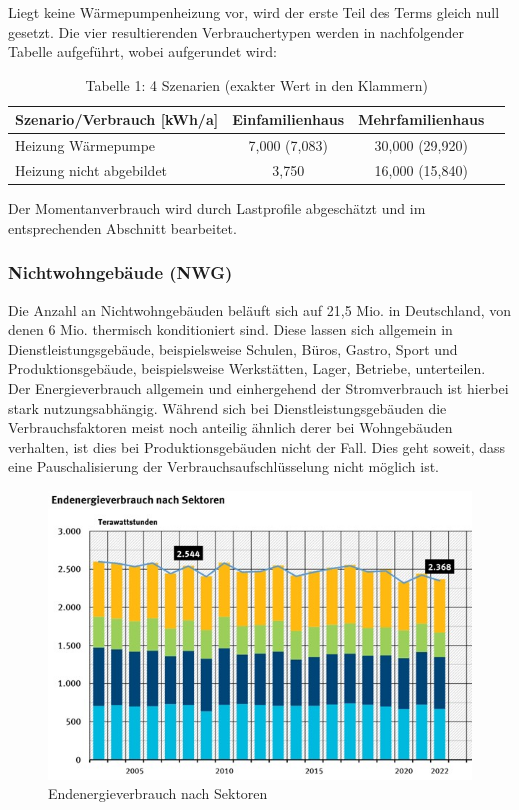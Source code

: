 Liegt keine Wärmepumpenheizung vor, wird der erste Teil des Terms gleich null gesetzt. 
Die vier resultierenden Verbrauchertypen werden in nachfolgender Tabelle aufgeführt, wobei aufgerundet wird:

\begin{table}[htbp]
    \centering
    \caption{Tabelle 1: 4 Szenarien (exakter Wert in den Klammern)}
    \label{tab:szenarien}
    \begin{tabular}{lccc}
        \toprule
        \textbf{Szenario/Verbrauch [kWh/a]} & \textbf{Einfamilienhaus} & \textbf{Mehrfamilienhaus} \\
        \midrule
        Heizung Wärmepumpe & 7,000 (7,083) & 30,000 (29,920) \\
        Heizung nicht abgebildet & 3,750 & 16,000 (15,840) \\
        \bottomrule
    \end{tabular}
\end{table}

Der Momentanverbrauch wird durch Lastprofile abgeschätzt und im entsprechenden Abschnitt bearbeitet.

\subsubsection{Nichtwohngebäude (NWG)}

Die Anzahl an Nichtwohngebäuden beläuft sich auf 21,5 Mio. in Deutschland, von denen 6 Mio. thermisch konditioniert sind. 
Diese lassen sich allgemein in Dienstleistungsgebäude, beispielsweise Schulen, Büros, Gastro, Sport und Produktionsgebäude, beispielsweise Werkstätten, Lager, Betriebe, unterteilen. 
Der Energieverbrauch allgemein und einhergehend der Stromverbrauch ist hierbei stark nutzungsabhängig. 
Während sich bei Dienstleistungsgebäuden die Verbrauchsfaktoren meist noch anteilig ähnlich derer bei Wohngebäuden verhalten, ist dies bei Produktionsgebäuden nicht der Fall. 
Dies geht soweit, dass eine Pauschalisierung der Verbrauchsaufschlüsselung nicht möglich ist.

\begin{figure}[h!]
    \centering
    \includegraphics[width=14cm]{Abbildungen/VerbraucherAbb3.jpg}
    \caption{Endenergieverbrauch nach Sektoren}\label{fig:Endenergieverbrauch_nach_Sektoren}
\end{figure}

